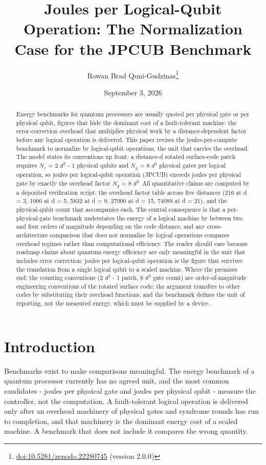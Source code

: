 \documentclass[11pt]{article}
\title{Joules per Logical-Qubit Operation: The Normalization Case for the JPCUB Benchmark}
\author{Rowan Brad Quni-Gudzinas\thanks{\href{https://doi.org/10.5281/zenodo.22280745}{doi:10.5281/zenodo.22280745} (version 2.0.0)}}
\date{September 3, 2026}
\begin{document}
\maketitle
\begin{abstract}
Energy benchmarks for quantum processors are usually quoted per physical gate or per physical qubit, figures that hide the dominant cost of a fault-tolerant machine: the error-correction overhead that multiplies physical work by a distance-dependent factor before any logical operation is delivered. This paper revises the joules-per-compute benchmark to normalize by logical-qubit operations, the unit that carries the overhead. The model states its conventions up front: a distance-d rotated surface-code patch requires $N_{c}$ = 2 $d^{2}$ - 1 physical qubits and $N_{g}$ = 8 $d^{3}$ physical gates per logical operation, so joules per logical-qubit operation (JPCUB) exceeds joules per physical gate by exactly the overhead factor $N_{g}$ = 8 $d^{3.}$ All quantitative claims are computed by a deposited verification script: the overhead factor table across five distances (216 at d = 3, 1000 at d = 5, 5832 at d = 9, 27000 at d = 15, 74088 at d = 21), and the physical-qubit count that accompanies each. The central consequence is that a per-physical-gate benchmark understates the energy of a logical machine by between two and four orders of magnitude depending on the code distance, and any cross-architecture comparison that does not normalize by logical operations compares overhead regimes rather than computational efficiency. The reader should care because roadmap claims about quantum energy efficiency are only meaningful in the unit that includes error correction: joules per logical-qubit operation is the figure that survives the translation from a single logical qubit to a scaled machine. Where the premises end: the counting conventions (2 $d^{2}$ - 1 patch, 8 $d^{3}$ gate count) are order-of-magnitude engineering conventions of the rotated surface code; the argument transfers to other codes by substituting their overhead functions; and the benchmark defines the unit of reporting, not the measured energy, which must be supplied by a device.
\end{abstract}
\section{Introduction}
Benchmarks exist to make comparisons meaningful. The energy benchmark of a quantum processor currently has no agreed unit, and the most common candidates - joules per physical gate and joules per physical qubit - measure the controller, not the computation. A fault-tolerant logical operation is delivered only after an overhead machinery of physical gates and syndrome rounds has run to completion, and that machinery is the dominant energy cost of a scaled machine. A benchmark that does not include it compares the wrong quantity.
\end{document}
